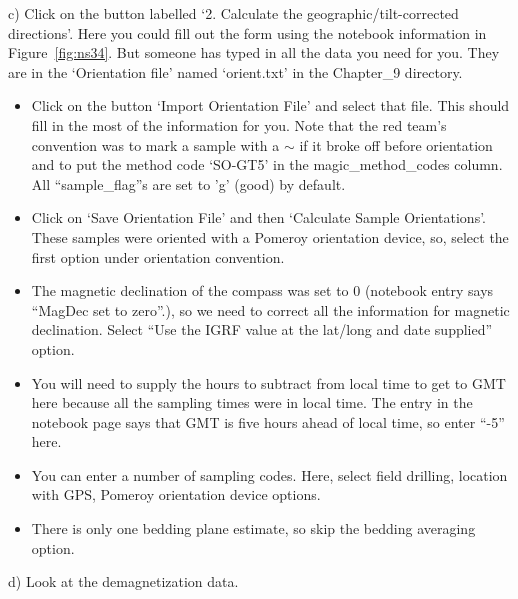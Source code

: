 {c)  Click on the button labelled `2. Calculate the geographic/tilt-corrected directions'.   Here you could fill out the form using the notebook information in Figure~\ref{fig:ns34}.  But someone has typed in all the data you need for you.  They are in the `Orientation file' named `orient.txt' in the Chapter\_9 directory.  
\begin{itemize}
\item Click on the button `Import Orientation File' and select that file.  This should fill in the most of the information for you.   Note that the red team's convention was to mark a sample with a $\sim$ if it broke off before orientation and to put the method code `SO-GT5' in the magic\_method\_codes column.   All  ``sample\_flag''s  are set to 'g'  (good) by default.  
\item Click on `Save Orientation File' and then `Calculate Sample Orientations'.   
These samples were oriented with a Pomeroy orientation device, so, select the first option under orientation convention.  
\item The magnetic declination of the compass was set to 0 (notebook entry says ``MagDec set to zero''.), so we need to correct all the information for magnetic declination.  Select ``Use the IGRF value at the lat/long and date supplied'' option. 
\item You will need to supply the hours to subtract from local time to get to GMT here because all the sampling times were in local time.  The entry in the notebook page says that GMT is five hours ahead of local time, so enter ``-5'' here.   
\item  You can enter a number of sampling codes.  Here, select field drilling,  location with GPS, Pomeroy orientation device  options.   
\item  There is only one bedding plane estimate, so skip the bedding averaging option.
\end{itemize}


d) Look at the demagnetization data. 

}
